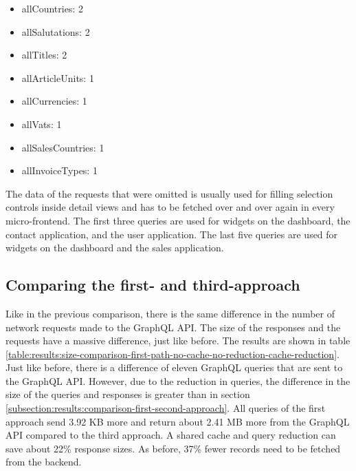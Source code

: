 \begin{itemize}
  \item allCountries: 2
  \item allSalutations: 2
  \item allTitles: 2
  \item allArticleUnits: 1
  \item allCurrencies: 1
  \item allVats: 1
  \item allSalesCountries: 1
  \item allInvoiceTypes: 1
\end{itemize}

\noindent The data of the requests that were omitted is usually used for filling selection controls inside detail views and has to be fetched over and over again in every micro-frontend. The first three queries are used for widgets on the dashboard, the contact application, and the user application. The last five queries are used for widgets on the dashboard and the sales application.

\subsection{Comparing the first- and third-approach}\label{subsection:results:comparison-first-third-approach}

Like in the previous comparison, there is the same difference in the number of network requests made to the GraphQL \ac{API}. The size of the responses and the requests have a massive difference, just like before. The results are shown in table \ref{table:results:size-comparison-first-path-no-cache-no-reduction-cache-reduction}. Just like before, there is a difference of eleven GraphQL queries that are sent to the GraphQL \ac{API}. However, due to the reduction in queries, the difference in the size of the queries and responses is greater than in section \ref{subsection:results:comparison-first-second-approach}. All queries of the first approach send 3.92 KB more and return about 2.41 MB more from the GraphQL \ac{API} compared to the third approach. A shared cache and query reduction can save about 22\% response sizes. As before, 37\% fewer records need to be fetched from the backend.

